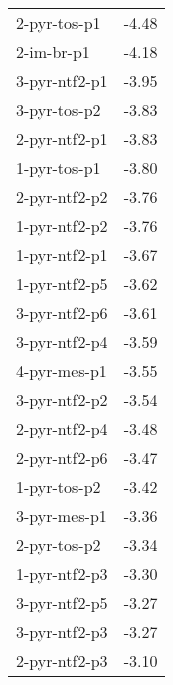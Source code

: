 \documentclass[a4paper]{article}
\begin{document}
\begin{table}[ht]
\begin{tabular}{lr}
  2-pyr-tos-p1 & -4.48 \\ 
  2-im-br-p1 & -4.18 \\ 
  3-pyr-ntf2-p1 & -3.95 \\ 
  3-pyr-tos-p2 & -3.83 \\ 
  2-pyr-ntf2-p1 & -3.83 \\ 
  1-pyr-tos-p1 & -3.80 \\ 
  2-pyr-ntf2-p2 & -3.76 \\ 
  1-pyr-ntf2-p2 & -3.76 \\ 
  1-pyr-ntf2-p1 & -3.67 \\ 
  1-pyr-ntf2-p5 & -3.62 \\ 
  3-pyr-ntf2-p6 & -3.61 \\ 
  3-pyr-ntf2-p4 & -3.59 \\ 
  4-pyr-mes-p1 & -3.55 \\ 
  3-pyr-ntf2-p2 & -3.54 \\ 
  2-pyr-ntf2-p4 & -3.48 \\ 
  2-pyr-ntf2-p6 & -3.47 \\ 
  1-pyr-tos-p2 & -3.42 \\ 
  3-pyr-mes-p1 & -3.36 \\ 
  2-pyr-tos-p2 & -3.34 \\ 
  1-pyr-ntf2-p3 & -3.30 \\ 
  3-pyr-ntf2-p5 & -3.27 \\ 
  3-pyr-ntf2-p3 & -3.27 \\ 
  2-pyr-ntf2-p3 & -3.10 \\ 
   \hline
\end{tabular}
\end{table}
\end{document}

